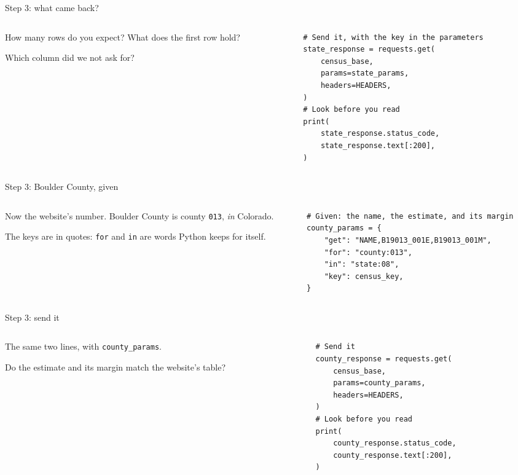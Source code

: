 \documentclass[9pt,aspectratio=169]{beamer}
\begin{document}
\begin{frame}[fragile]{Step 3: what came back?}
    \begin{columns}[T]
        \begin{column}{0.37\textwidth}
            How many rows do you expect? What does the first row hold?

            \medskip
            Which column did we not ask for?
        \end{column}
        \begin{column}{0.6\textwidth}
\begin{lstlisting}
# Send it, with the key in the parameters
state_response = requests.get(
    census_base,
    params=state_params,
    headers=HEADERS,
)
# Look before you read
print(
    state_response.status_code,
    state_response.text[:200],
)
\end{lstlisting}
        \end{column}
    \end{columns}
\end{frame}

\begin{frame}[fragile]{Step 3: Boulder County, given}
    \begin{columns}[T]
        \begin{column}{0.37\textwidth}
            Now the website's number. Boulder County is county \texttt{013}, \textit{in} Colorado.

            \medskip
            The keys are in quotes: \texttt{for} and \texttt{in} are words Python keeps for itself.
        \end{column}
        \begin{column}{0.6\textwidth}
\begin{lstlisting}
# Given: the name, the estimate, and its margin
county_params = {
    "get": "NAME,B19013_001E,B19013_001M",
    "for": "county:013",
    "in": "state:08",
    "key": census_key,
}
\end{lstlisting}
        \end{column}
    \end{columns}
\end{frame}

\begin{frame}[fragile]{Step 3: send it}
    \begin{columns}[T]
        \begin{column}{0.37\textwidth}
            The same two lines, with \texttt{county\_params}.

            \medskip
            Do the estimate and its margin match the website's table?
        \end{column}
        \begin{column}{0.6\textwidth}
\begin{lstlisting}
# Send it
county_response = requests.get(
    census_base,
    params=county_params,
    headers=HEADERS,
)
# Look before you read
print(
    county_response.status_code,
    county_response.text[:200],
)
\end{lstlisting}
        \end{column}
    \end{columns}
\end{frame}
\end{document}
